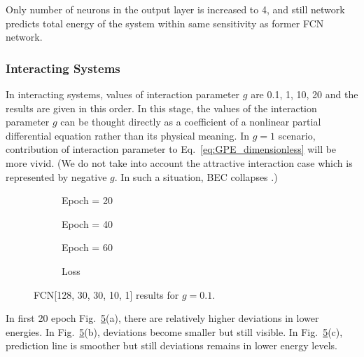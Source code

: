 \documentclass[a4paper,times,12pt]{article}
\begin{document}
Only number of neurons in the output layer is increased to 4, and still network predicts total energy of the system within same sensitivity as former FCN network.


\subsubsection{Interacting Systems}

In interacting systems, values of interaction parameter $g$ are 0.1, 1, 10, 20 and the results are given in this order. In this stage, the values of the interaction parameter $g$ can be thought directly as a coefficient of a nonlinear partial differential equation rather than its physical meaning. In $g =1$ scenario, contribution of interaction parameter to Eq.~\eqref{eq:GPE_dimensionless} will be more vivid. (We do not take into account the attractive interaction case which is represented by negative $g$. In such a situation, BEC collapses \cite{barenghi2016primer}.)

\begin{figure}[H]
    \centering
    \begin{subfigure}[t]{0.45\textwidth}
		\centering
        
        \caption{Epoch = 20}
		\label{fig:a}
    \end{subfigure}
    \begin{subfigure}[t]{0.45\textwidth}
		\centering
        
        \caption{Epoch = 40}
		\label{fig:b}
    \end{subfigure}    
    \begin{subfigure}[t]{0.45\textwidth}
        \centering
        
        \caption{Epoch = 60}
		\label{fig:c}
    \end{subfigure}
    \begin{subfigure}[t]{0.45\textwidth}
        \centering
        
        \caption{Loss}
		\label{fig:c}
    \end{subfigure}
	\caption{FCN[128, 30, 30, 10, 1] results for $g = 0.1$.}
\label{fig:FFN-g-0.1}
\end{figure}

In first 20 epoch Fig.~\ref{fig:FFN-g-0.1}(a), there are relatively higher deviations in lower energies. In Fig.~\ref{fig:FFN-g-0.1}(b), deviations become smaller but still visible. In Fig.~\ref{fig:FFN-g-0.1}(c), prediction line is smoother but still deviations remains in lower energy levels.
\end{document}
